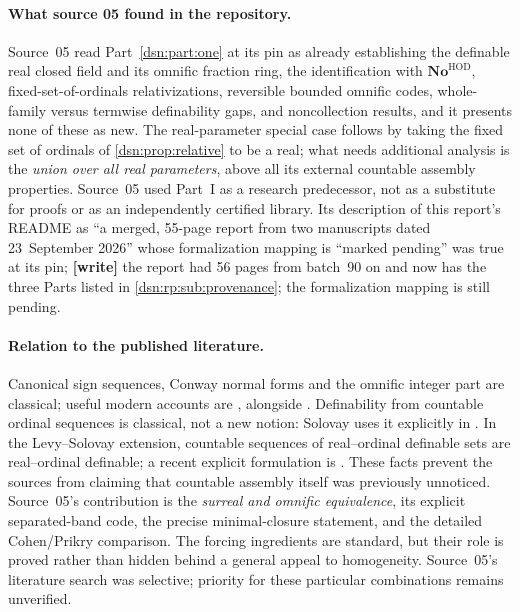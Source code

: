 \documentclass[11pt,a4paper]{article}
\numberwithin{equation}{section}
\theoremstyle{definition}
\theoremstyle{remark}
\newcommand{\No}{\mathbf{No}}
\newcommand{\HOD}{\mathrm{HOD}}
\begin{document}
\paragraph{What source 05 found in the repository.}
Source~05 read Part~\ref{dsn:part:one} at its pin as already establishing
the definable real closed field and its omnific fraction ring, the
identification with $\No^{\HOD}$, fixed-set-of-ordinals relativizations,
reversible bounded omnific codes, whole-family versus termwise
definability gaps, and noncollection results, and it presents none of
these as new. The real-parameter special case follows by taking the fixed
set of ordinals of \cref{dsn:prop:relative} to be a real; what needs
additional analysis is the \emph{union over all real parameters}, above
all its external countable assembly properties. Source~05 used Part~I as a
research predecessor, not as a substitute for proofs or as an
independently certified library. Its description of this report's README
as ``a merged, 55-page report from two manuscripts dated 23~September
2026'' whose formalization mapping is ``marked pending'' was true at its
pin; \textbf{[write]} the report had 56 pages from batch~90 on and now has
the three Parts listed in \cref{dsn:rp:sub:provenance}; the formalization
mapping is still pending.

\paragraph{Relation to the published literature.}
Canonical sign sequences, Conway normal forms and the omnific integer part
are classical; useful modern accounts are \cite{EhrlichKaplanJSL,LM},
alongside \cite{Conway,Gonshor}. Definability from countable ordinal
sequences is classical, not a new notion: Solovay uses it explicitly in
\cite[III.2.2--III.2.6]{Solovay}. In the Levy--Solovay extension, countable
sequences of real--ordinal definable sets are real--ordinal definable; a
recent explicit formulation is \cite[Proposition~2.2(i), version~1]{KL}.
These facts prevent the sources from claiming that countable assembly
itself was previously unnoticed. Source~05's contribution is the
\emph{surreal and omnific equivalence}, its explicit separated-band code,
the precise minimal-closure statement, and the detailed Cohen/Prikry
comparison. The forcing ingredients are standard, but their role is proved
rather than hidden behind a general appeal to homogeneity. Source~05's
literature search was selective; priority for these particular
combinations remains unverified.
\end{document}
